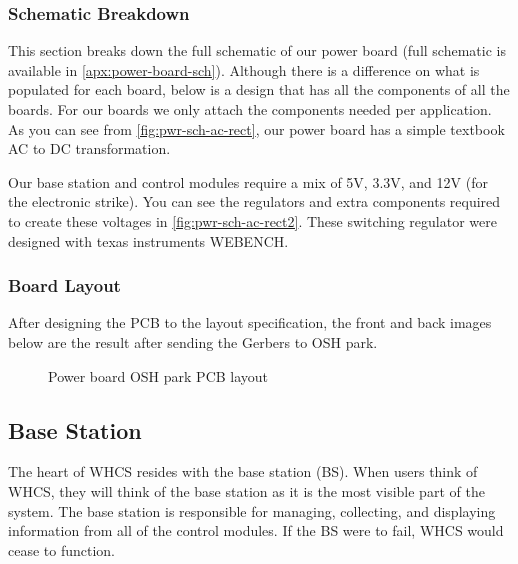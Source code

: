 \subsubsection{Schematic Breakdown}
This section breaks down the full schematic of our power board (full schematic
is available in \autoref{apx:power-board-sch}). Although there is a difference on what is populated for each board, below is a design that has all the components of all
the boards. For our boards we only attach the components needed per
application. As you can see from \autoref{fig:pwr-sch-ac-rect}, our power board
has a simple textbook AC to DC transformation.


Our base station and control modules require a mix of 5V, 3.3V, and 12V (for the electronic strike). You can see the regulators and extra components required to create these voltages in \autoref{fig:pwr-sch-ac-rect2}. These switching regulator were designed with texas instruments WEBENCH.


\subsubsection{Board Layout}
After designing the PCB to the layout specification, the front and back images below are the result after sending the Gerbers to OSH park.

\begin{figure}[H]
\caption{Power board OSH park PCB layout}
\label{fig:power-board-pcb}
\end{figure}


\subsection{Base Station}
The heart of WHCS resides with the base station (BS). When users think of WHCS, they
will think of the base station as it is the most visible part of the system.
The base station is responsible for managing, collecting, and displaying
information from all of the control modules. If the BS were to fail, WHCS
would cease to function.

